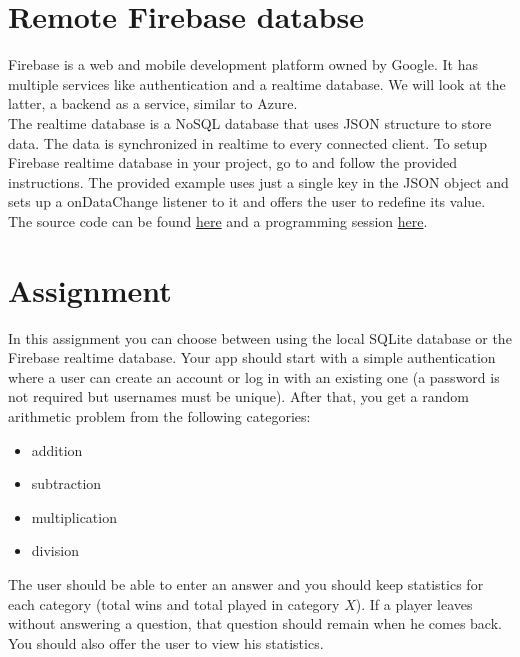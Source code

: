 \section{Remote Firebase databse}
Firebase is a web and mobile development platform owned by Google. It has multiple services like authentication and a realtime database. We will look at the latter, a backend as a service, similar to Azure.\\

The realtime database is a NoSQL database that uses JSON structure to store data. The data is synchronized in realtime to every connected client. To setup Firebase realtime database in your project, go to  and follow the provided instructions. The provided example uses just a single key in the JSON object and sets up a onDataChange listener to it and offers the user to redefine its value. The source code can be found \href{https://github.com/JonSteinn/AndroidDevelopment/tree/master/examples/lab5/firebase}{here} and a programming session \href{TODO}{here}.

\section{Assignment}
In this assignment you can choose between using the local SQLite database or the Firebase realtime database. Your app should start with a simple authentication where a user can create an account or log in with an existing one (a password is not required but usernames must be unique). After that, you get a random arithmetic problem from the following categories:
\begin{itemize}
\item addition
\item subtraction
\item multiplication
\item division
\end{itemize}
The user should be able to enter an answer and you should keep statistics for each category (total wins and total played in category $X$). If a player leaves without answering a question, that question should remain when he comes back. You should also offer the user to view his statistics.